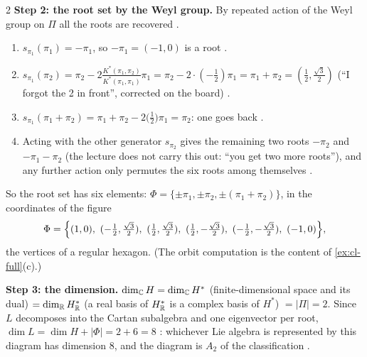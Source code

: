 \begin{paracol}{2}
\textbf{Step 2: the root set by the Weyl group.} By repeated action of the Weyl group on $\Pi$ all the roots are recovered .
\begin{enumerate}
  \item $s_{\pi_1}(\pi_1)=-\pi_1$, so $-\pi_1=(-1,0)$ is a root .
  \item $s_{\pi_1}(\pi_2)=\pi_2-2\frac{K^*(\pi_1,\pi_2)}{K^*(\pi_1,\pi_1)}\pi_1=\pi_2-2\cdot(-\tfrac12)\pi_1=\pi_1+\pi_2=(\tfrac12,\tfrac{\sqrt3}2)$ (``I forgot the 2 in front'', corrected on the board)     .
  \item $s_{\pi_1}(\pi_1+\pi_2)=\pi_1+\pi_2-2\bigl(\tfrac12\bigr)\pi_1=\pi_2$: one goes back   .
  \item Acting with the other generator $s_{\pi_2}$ gives the remaining two roots $-\pi_2$ and $-\pi_1-\pi_2$ (the lecture does not carry this out: ``you get two more roots''), and any further action only permutes the six roots among themselves  .
\end{enumerate}
So the root set has six elements: $\Phi=\{\pm\pi_1,\pm\pi_2,\pm(\pi_1+\pi_2)\}$, in the coordinates of the figure
\[
  \Phi=\Bigl\{(1,0),\ (-\tfrac12,\tfrac{\sqrt3}2),\ (\tfrac12,\tfrac{\sqrt3}2),\ (\tfrac12,-\tfrac{\sqrt3}2),\ (-\tfrac12,-\tfrac{\sqrt3}2),\ (-1,0)\Bigr\},
\]
the vertices of a regular hexagon. (The orbit computation is the content of \cref{ex:cl-full}(c).)
\begin{center}
\end{center}
\textbf{Step 3: the dimension.} $\dim_{\mathbb{C}}H=\dim_{\mathbb{C}}H^*$ (finite-dimensional space and its dual) $=\dim_{\mathbb{R}}H^*_{\mathbb{R}}$ (a real basis of $H^*_{\mathbb{R}}$ is a complex basis of $H^*$) $=|\Pi|=2$. Since $L$ decomposes into the Cartan subalgebra and one eigenvector per root, $\dim L=\dim H+|\Phi|=2+6=8$    : whichever Lie algebra is represented by this diagram has dimension $8$, and the diagram is $A_2$ of the classification .

\end{paracol}
